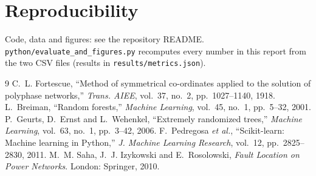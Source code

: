 \documentclass[11pt,a4paper]{article}
\begin{document}
\section*{Reproducibility}
Code, data and figures: see the repository README. \texttt{python/evaluate\_and\_figures.py} recomputes every number in this report from the two CSV files (results in \texttt{results/metrics.json}).

\begin{thebibliography}{9}
 C.~L. Fortescue, ``Method of symmetrical co-ordinates applied to the solution of polyphase networks,'' \emph{Trans. AIEE}, vol.~37, no.~2, pp.~1027--1140, 1918.
 L.~Breiman, ``Random forests,'' \emph{Machine Learning}, vol.~45, no.~1, pp.~5--32, 2001.
 P.~Geurts, D.~Ernst and L.~Wehenkel, ``Extremely randomized trees,'' \emph{Machine Learning}, vol.~63, no.~1, pp.~3--42, 2006.
 F.~Pedregosa \emph{et al.}, ``Scikit-learn: Machine learning in Python,'' \emph{J. Machine Learning Research}, vol.~12, pp.~2825--2830, 2011.
 M.~M. Saha, J.~J. Izykowski and E.~Rosolowski, \emph{Fault Location on Power Networks}. London: Springer, 2010.
\end{thebibliography}
\end{document}
